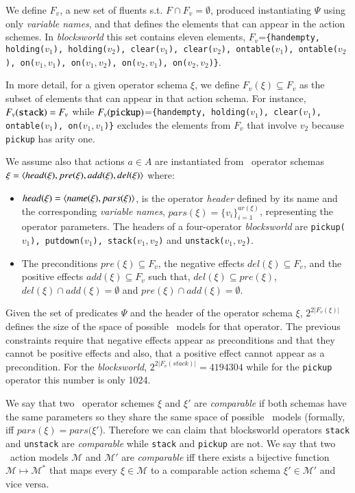 We define $F_v$, a new set of fluents s.t. $F\cap F_v=\emptyset$, produced instantiating $\Psi$ using only {\em variable names}, and that defines the elements that can appear in the action schemes. In {\em blocksworld} this set contains eleven elements, $F_v$={\small\tt\{handempty, holding($v_1$), holding($v_2$), clear($v_1$), clear($v_2$), ontable($v_1$), ontable($v_2$), on($v_1,v_1$), on($v_1,v_2$), on($v_2,v_1$), on($v_2,v_2$)\}}.

In more detail, for a given operator schema $\xi$, we define $F_v(\xi)\subseteq F_v$ as the subset of elements that can appear in that action schema. For instance, $F_v({\tt stack})=F_v$ while $F_v({\tt pickup})$={\small\tt\{handempty, holding($v_1$), clear($v_1$), ontable($v_1$), on($v_1,v_1$)\}} excludes the elements from $F_v$ that involve $v_2$ because {\small\tt pickup} has arity one.

We assume also that actions $a\in A$ are instantiated from \strips\ operator schemas $\xi={\langle head(\xi),pre(\xi),add(\xi),del(\xi) \rangle}$ where:
\begin{itemize}
\item $head(\xi)={\langle name(\xi),pars(\xi) \rangle}$, is the operator {\em header} defined by its name and the corresponding {\em variable names}, $pars(\xi)=\{v_i\}_{i=1}^{ar(\xi)}$, representing the operator parameters. The headers of a four-operator {\em blocksworld} are {\small\tt pickup($v_1$), putdown($v_1$), stack($v_1,v_2$)} and {\small\tt unstack($v_1,v_2$)}.
\item The preconditions $pre(\xi)\subseteq F_v$, the negative effects $del(\xi)\subseteq F_v$, and the positive effects $add(\xi)\subseteq F_v$ such that, $del(\xi)\subseteq pre(\xi)$, $del(\xi)\cap add(\xi)=\emptyset$ and $pre(\xi)\cap add(\xi)=\emptyset$.
\end{itemize}
Given the set of predicates $\Psi$ and the header of the operator schema $\xi$, $2^{2|F_v(\xi)|}$ defines the size of the space of possible \strips\ models for that operator. The previous constraints require that negative effects appear as preconditions and that they cannot be positive effects and also, that a positive effect cannot appear as a precondition. For the {\em blocksworld}, $2^{2|F_v(stack)|}=4194304$ while for the {\tt pickup} operator this number is only 1024.

We say that two \strips\ operator schemes $\xi$ and $\xi'$ are {\em comparable} if both schemas have the same parameters so they share the same space of possible \strips\ models (formally, iff $pars(\xi)=pars(\xi'$). Therefore  we can claim that blocksworld operators {\tt stack} and {\tt unstack} are {\em comparable} while  {\tt stack} and {\tt pickup} are not. We say that two \strips\ action models $\mathcal{M}$ and $\mathcal{M}'$ are {\em comparable} iff there exists a bijective function $\mathcal{M} \mapsto \mathcal{M}^*$ that maps every $\xi\in\mathcal{M}$ to a comparable action schema $\xi'\in\mathcal{M'}$ and vice versa.


